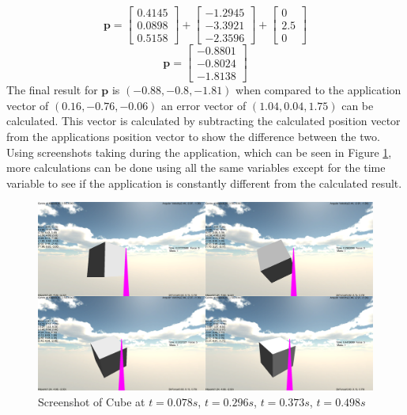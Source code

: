 \begin{equation}\label{eq:working2}
	\mathbf{p}=
	\begin{bmatrix}
		 0.4145  \\
		 0.0898  \\
		 0.5158 
	\end{bmatrix}
	+
	\begin{bmatrix}
		-1.2945 \\
		-3.3921 \\
		-2.3596 
	\end{bmatrix}
	+
	\begin{bmatrix}
		 0 \\
		 2.5 \\
		 0 
	\end{bmatrix}
\end{equation}
\begin{equation}\label{eq:final}
	\mathbf{p}=
	\begin{bmatrix}
		-0.8801 \\
 		-0.8024 \\
 		-1.8138 
	\end{bmatrix}
\end{equation}
The final result for $\mathbf{p}$ is $(-0.88,-0.8,-1.81)$ when compared to the application vector of $(0.16,-0.76,-0.06)$ an error vector of $(1.04,0.04,1.75)$ can be calculated.
This vector is calculated by subtracting the calculated position vector from the applications position vector to show the difference between the two.
Using screenshots taking during the application, which can be seen in Figure \ref{fig:ScreenShotFour}, more calculations can be done using all the same variables except for the time variable to see if the application is constantly different from the calculated result.
\begin{figure}[H]
	\centering
	\includegraphics[width=\textwidth]{images/Screenshot1.PNG}
	\caption{Screenshot of Cube at $t = 0.078 s$, $t = 0.296 s$, $t = 0.373 s$, $t = 0.498 s$}
	\label{fig:ScreenShotFour}
\end{figure}
